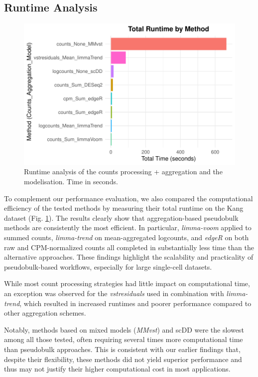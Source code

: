 \documentclass[a4paper, 11pt, twocolumn]{article}
\begin{document}
\begin{multicols}{2}
	
\subsection{Runtime Analysis}

\begin{figure}[H]
	\centering
	\includegraphics[width=1\columnwidth]{figs/plot_runtime_Kang.pdf}
	\caption{{\footnotesize Runtime analysis of the counts processing + aggregation and the modelisation. Time in seconds.}}
	\label{fig:runtime}
\end{figure}

To complement our performance evaluation, we also compared the computational efficiency of the tested methods by measuring their total runtime on the Kang dataset (Fig. \ref{fig:runtime}). The results clearly show that aggregation-based pseudobulk methods are consistently the most efficient. In particular, \textit{limma-voom} applied to summed counts, \textit{limma-trend} on mean-aggregated logcounts, and \textit{edgeR} on both raw and CPM-normalized counts all completed in substantially less time than the alternative approaches. These findings highlight the scalability and practicality of pseudobulk-based workflows, especially for large single-cell datasets.

While most count processing strategies had little impact on computational time, an exception was observed for the \textit{vstresiduals} used in combination with \textit{limma-trend}, which resulted in increased runtimes and poorer performance compared to other aggregation schemes. 

Notably, methods based on mixed models (\textit{MMvst}) and scDD were the slowest among all those tested, often requiring several times more computational time than pseudobulk approaches. This is consistent with our earlier findings that, despite their flexibility, these methods did not yield superior performance and thus may not justify their higher computational cost in most applications.


\end{multicols}
\end{document}
